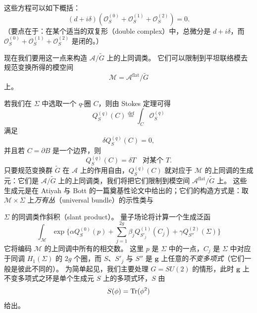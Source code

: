这些方程可以如下概括：
\begin{equation}
  \tag{11.17}
  \label{eq:11-17}
  (d+i\delta)\left(\mathcal{O}_{S}^{(0)}+\mathcal{O}_{S}^{(1)}+\mathcal{O}_{S}^{(2)}\right)=0.
\end{equation}
（要点在于：在某个适当的双复形（double complex）中，总微分是 $d+i\delta$，而 $\mathcal{O}_{S}^{(0)}+\mathcal{O}_{S}^{(1)}+\mathcal{O}_{S}^{(2)}$ 是闭的。）

现在我们要用这一点来构造 $\mathcal{A}/\widetilde G$ 上的上同调类。
它们可以限制到平坦联络模去规范变换所得的模空间
\begin{equation}
  \tag{11.18}
  \label{eq:11-18}
  \mathcal{M}=\mathcal{A}^{\mathrm{flat}}/\widetilde G
\end{equation}
上。

若我们在 $\Sigma$ 中选取一个 $q$-圈 $C$，则由 Stokes 定理可得
\[
Q_{S}^{(q)}(C)\overset{\mathrm{def}}{=}\int_{C}\mathcal{O}_{S}^{(q)}
\]
满足
\begin{equation}
  \tag{11.19}
  \label{eq:11-19}
  \delta Q_{S}^{(q)}(C)=0,
\end{equation}
并且若 $C=\partial B$ 是一个边界，则
\begin{equation}
  \tag{11.20}
  \label{eq:11-20}
  Q_{S}^{(q)}(C)=\delta T\quad\text{对某个 }T.
\end{equation}
只要规范变换群 $\widetilde G$ 在 $\mathcal{A}$ 上的作用自由，$Q_{S}^{(q)}(C)$ 就对应于 $\mathcal{M}$ 的上同调的生成元：它们是 $\mathcal{A}/\widetilde G$ 上的上同调类，我们将把它们限制到模空间 $\mathcal{A}^{\mathrm{flat}}/\widetilde G$ 上。
这些生成元是在 Atiyah 与 Bott 的一篇奠基性论文中给出的；它们的构造方式是：取 $\mathcal{M}\times\Sigma$ 上\emph{万有丛}（universal bundle）的示性类与

$\Sigma$ 的同调类作斜积（slant product）。
量子场论将计算一个生成泛函
\begin{equation}
  \tag{11.21}
  \label{eq:11-21}
  \int_{\mathcal{M}}\exp\Big\{\alpha Q_{S}^{(0)}(p)+\sum_{j=1}^{2g}\beta_{j}Q_{S'_{j}}^{(1)}(C_{j})
  +\gamma Q_{S''}^{(2)}(\Sigma)\Big\}
\end{equation}
它将编码 $\mathcal{M}$ 的上同调中所有的相交数。
这里 $p$ 是 $\Sigma$ 中的一点，$C_{j}$ 是 $\Sigma$ 中对应于同调 $H_{1}(\Sigma)$ 的 $2g$ 个圈，而 $S$、$S'_{j}$ 与 $S''$ 是 $\mathbf{g}$ 上任意的\emph{不变多项式}（它们一般是彼此不同的）。
为简单起见，我们主要处理 $G=SU(2)$ 的情形，此时 $\mathbf{g}$ 上不变多项式之环是单个生成元 $S$ 上的多项式环，$S$ 由
\[
S(\phi)=\operatorname{Tr}(\phi^{2})
\]
给出。


